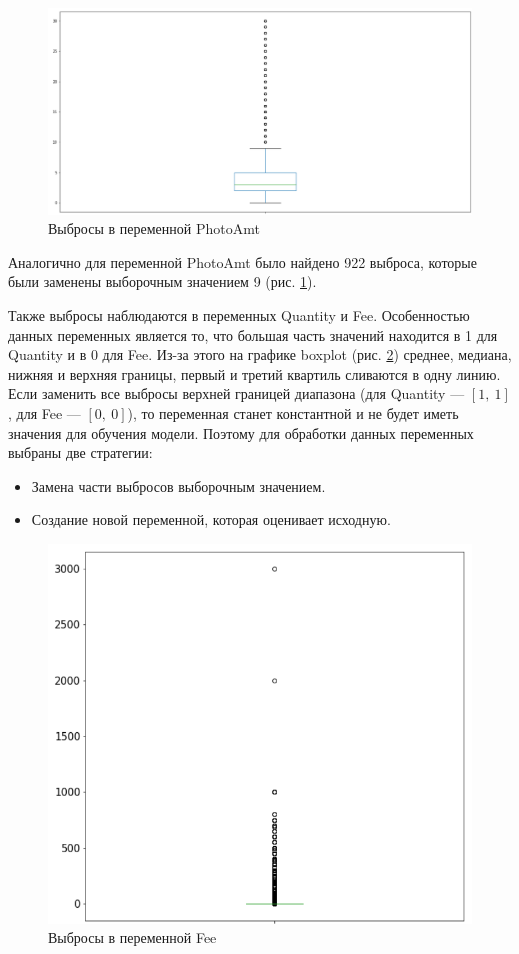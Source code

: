 \documentclass[14pt]{mmcs_article}
\begin{document}
\begin{figure}[H]
	\centering
	\includegraphics[scale=0.7]{photooutlier.png}
	\caption{Выбросы в переменной PhotoAmt}\label{analyse:photooutlier}
\end{figure}

Аналогично для переменной PhotoAmt было найдено 922 выброса, которые были заменены выборочным значением 9 (рис. \ref{analyse:photooutlier}).

Также выбросы наблюдаются в переменных Quantity и Fee. Особенностью данных переменных является то, что большая часть значений находится в 1 для Quantity и в 0 для Fee. Из-за этого на графике boxplot (рис. \ref{analyse:feeoutlier}) среднее, медиана, нижняя и верхняя границы, первый и третий квартиль сливаются в одну линию. Если заменить все выбросы верхней границей диапазона (для Quantity --- $[1,\ 1]$, для Fee --- $[0,\ 0]$), то переменная станет константной и не будет иметь значения для обучения модели. Поэтому для обработки данных переменных выбраны две стратегии:
\begin{itemize}
	\item Замена части выбросов выборочным значением.
	\item Создание новой переменной, которая оценивает исходную.
\end{itemize}

\begin{figure}[H]
	\centering
	\includegraphics[scale=0.7]{feeoutlier.png}
	\caption{Выбросы в переменной Fee}\label{analyse:feeoutlier}
\end{figure}
\end{document}
